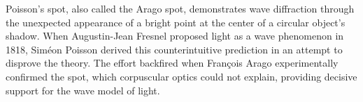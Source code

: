 Poisson’s spot, also called the Arago spot, demonstrates wave diffraction through the unexpected appearance of a bright point at the center of a circular object’s shadow. When Augustin-Jean Fresnel proposed light as a wave phenomenon in 1818, Siméon Poisson derived this counterintuitive prediction in an attempt to disprove the theory. The effort backfired when François Arago experimentally confirmed the spot, which corpuscular optics could not explain, providing decisive support for the wave model of light.